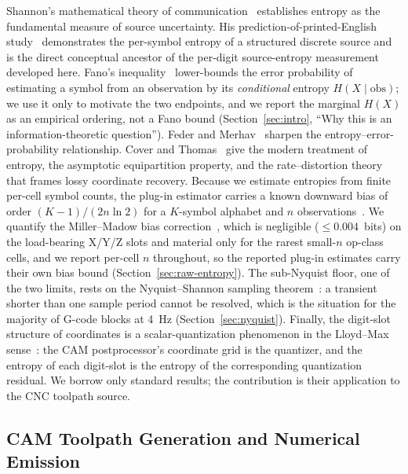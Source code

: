 \documentclass[entropy,article,submit,moreauthors,pdftex]{Definitions/mdpi}
\begin{document}
Shannon's mathematical theory of communication~\cite{shannon1948mathematical} establishes entropy as the fundamental measure of source uncertainty. His prediction-of-printed-English study~\cite{shannon1951prediction} demonstrates the per-symbol entropy of a structured discrete source and is the direct conceptual ancestor of the per-digit source-entropy measurement developed here. Fano's inequality~\cite{fano1961transmission} lower-bounds the error probability of estimating a symbol from an observation by its \emph{conditional} entropy $H(X\mid\text{obs})$; we use it only to motivate the two endpoints, and we report the marginal $H(X)$ as an empirical ordering, not a Fano bound (Section~\ref{sec:intro}, ``Why this is an information-theoretic question''). Feder and Merhav~\cite{feder1994relations} sharpen the entropy--error-probability relationship. Cover and Thomas~\cite{cover_thomas} give the modern treatment of entropy, the asymptotic equipartition property, and the rate--distortion theory~\cite{berger1971ratedistortion} that frames lossy coordinate recovery. Because we estimate entropies from finite per-cell symbol counts, the plug-in estimator carries a known downward bias of order $(K-1)/(2n\ln 2)$ for a $K$-symbol alphabet and $n$ observations~\cite{cover_thomas}. We quantify the Miller--Madow bias correction~\cite{miller1955note,paninski2003estimation}, which is negligible ($\le\!0.004$~bits) on the load-bearing X/Y/Z slots and material only for the rarest small-$n$ op-class cells, and we report per-cell $n$ throughout, so the reported plug-in estimates carry their own bias bound (Section~\ref{sec:raw-entropy}). The sub-Nyquist floor, one of the two limits, rests on the Nyquist--Shannon sampling theorem~\cite{nyquist1928certain,shannon1949communication}: a transient shorter than one sample period cannot be resolved, which is the situation for the majority of G-code blocks at 4~Hz (Section~\ref{sec:nyquist}). Finally, the digit-slot structure of coordinates is a scalar-quantization phenomenon in the Lloyd--Max sense~\cite{lloyd1982least,max1960quantizing}: the CAM postprocessor's coordinate grid is the quantizer, and the entropy of each digit-slot is the entropy of the corresponding quantization residual. We borrow only standard results; the contribution is their application to the CNC toolpath source.

\subsection{CAM Toolpath Generation and Numerical Emission}
\label{sec:related-cam}
\end{document}
